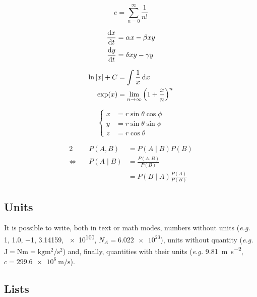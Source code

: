 \documentclass[a4paper, 12pt]{report}
\begin{document}
\begin{equation*}
	e = \sum_{n=0}^\infty \frac{1}{n!}
\end{equation*}

\begin{subequations}
	\begin{align}
		\frac{\mathrm{d} x}{\mathrm{d} t} & = \alpha x - \beta xy \\
		\frac{\mathrm{d} y}{\mathrm{d} t} & = \delta xy - \gamma y
	\end{align}
\end{subequations}

\begin{align*}
	\ln \left|x\right| + C & = \int \frac{1}{x} \,\mathrm{d} x \\
	\exp(x) & = \lim_{n \to \infty} \left(1 + \frac{x}{n}\right)^n
\end{align*}

\begin{equation}
	\left\{
	\begin{aligned}
		x & = r \sin \theta \cos \phi \\
		y & = r \sin \theta \sin \phi \\
		z & = r \cos \theta
	\end{aligned}
	\right.
\end{equation}

\begin{alignat*}{2}
	& P(A, B)  & = P(A \mid B) P(B)                        \\
	\Leftrightarrow \quad & P(A \mid B) & = \frac{P(A, B)}{P(B)}                 \\
	&          & = P(B \mid A) \frac{P(A)}{P(B)}
\end{alignat*}

\subsection{Units}

It is possible to write, both in text or math modes, numbers without units (\emph{e.g.} \num{1}, \num{1.0}, \num{-1}, \num{3.14159}, \num{e100}, $N_A = \num{6.022e23}$), units without quantity (\emph{e.g.} $\si{\joule} = \si{\newton\meter} = \si{\kilogram\meter\squared\per\second\squared}$) and, finally, quantities with their units (\emph{e.g.} \SI{9.81}{\meter\per\second\squared}, $c = \SI{299.6e6}{\meter\per\second}$).

\subsection{Lists}
\end{document}
